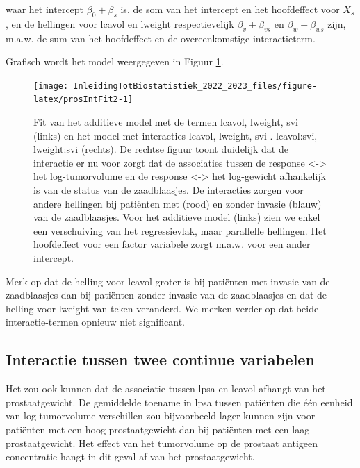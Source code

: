 \documentclass[
  12pt,dutch,coursenotes]{book}
\begin{document}
waar het intercept \(\beta_0 + \beta_s\) is, de som van het intercept en het hoofdeffect voor \(X_s\), en de hellingen voor lcavol en lweight respectievelijk \(\beta_v+\beta_{vs}\) en \(\beta_w+\beta_{ws}\) zijn, m.a.w. de sum van het hoofdeffect en de overeenkomstige interactieterm.

Grafisch wordt het model weergegeven in Figuur \ref{fig:prosIntFit2}.

\begin{figure}

{\centering \texttt{[image: InleidingTotBiostatistiek\_2022\_2023\_files/figure-latex/prosIntFit2-1]} 

}

\caption{Fit van het additieve model met de termen lcavol, lweight, svi (links) en het model met interacties lcavol, lweight, svi . lcavol:svi, lweight:svi (rechts). De rechtse figuur toont duidelijk dat de interactie er nu voor zorgt dat de associaties tussen de response <-> het log-tumorvolume en de response <-> het log-gewicht afhankelijk is van de status van de zaadblaasjes. De interacties zorgen voor andere hellingen bij patiënten met (rood) en zonder invasie (blauw) van de zaadblaasjes. Voor het additieve model (links) zien we enkel een verschuiving van het regressievlak, maar parallelle hellingen. Het hoofdeffect voor een factor variabele zorgt m.a.w. voor een ander intercept.}\label{fig:prosIntFit2}
\end{figure}

Merk op dat de helling voor lcavol groter is bij patiënten met invasie van de zaadblaasjes dan bij patiënten zonder invasie van de zaadblaasjes en dat de helling voor lweight van teken veranderd. We merken verder op dat beide interactie-termen opnieuw niet significant.

\hypertarget{sec:intCont}{%
\subsection{Interactie tussen twee continue variabelen}\label{sec:intCont}}

Het zou ook kunnen dat de associatie tussen lpsa en lcavol afhangt van het prostaatgewicht. De gemiddelde toename in lpsa tussen patiënten die één eenheid van log-tumorvolume verschillen zou bijvoorbeeld lager kunnen zijn voor patiënten met een hoog prostaatgewicht dan bij patiënten met een laag prostaatgewicht. Het effect van het tumorvolume op de prostaat antigeen concentratie hangt in dit geval af van het prostaatgewicht.
\end{document}
